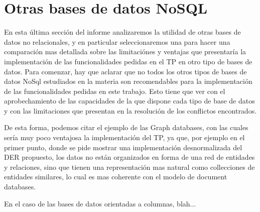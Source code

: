 \section{Otras bases de datos NoSQL}

En esta \'ultima secci\'on del informe analizaremos la utilidad de otras bases de datos no relacionales, y en particular seleccionaremos una para hacer una comparaci\'on mas detallada sobre las limitaci\'ones y ventajas que presentar\'ia la implementaci\'on de las funcionalidades pedidas en el TP en otro tipo de bases de datos. Para comenzar, hay que aclarar que no todos los otros tipos de bases de datos NoSql estudiados en la materia son recomendables para la implementaci\'on de las funcionalidades pedidas en este trabajo. Esto tiene que ver con el aprobechamiento de las capacidades de la que dispone cada tipo de base de datos y con las limitaciones que presentan en la resoluci\'on de los conflictos encontrados. 

De esta forma, podemos citar el ejemplo de las Graph databases, con las cuales ser\'ia muy poco ventajosa la implementaci\'on del TP, ya que, por ejemplo en el primer punto, donde se pide mostrar una implementaci\'on desnormalizada del DER propuesto, los datos no est\'an organizados en forma de una red de entidades y relaciones, sino que tienen una representaci\'on mas natural como collecciones de entidades similares, lo cual es mas coherente con el modelo de document databases.

En el caso de las bases de datos orientadas a columnas, blah...

